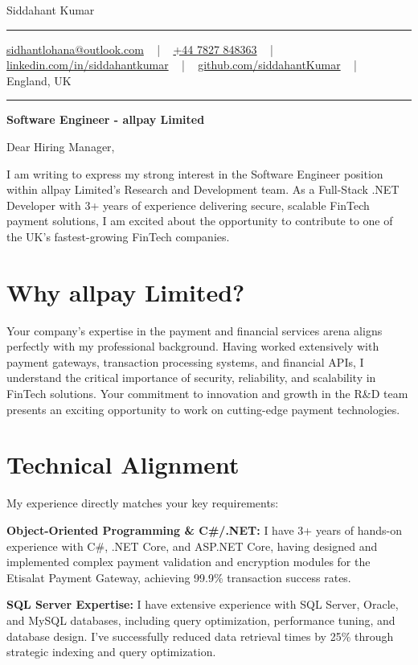 \documentclass[letterpaper,10pt]{article}
\newcommand{\documentTitle}[2]{
  \begin{center}
    \vspace*{-0.3in}
    {\Huge\color{accentTitle} #1}
    \vspace{8pt}
    {\color{accentLine} \hrule}
    \vspace{2pt}
    \footnotesize{#2}
    \vspace{2pt}
    {\color{accentLine} \hrule}
  \end{center}
}
\begin{document}
\documentTitle{Siddahant Kumar}{
\vspace{0.1cm}
\href{mailto:sidhantlohana@outlook.com}{sidhantlohana@outlook.com} ~ | ~
\href{tel:+447827848363}{+44 7827 848363} ~ | ~
\href{https://www.linkedin.com/in/siddahantkumar/}{linkedin.com/in/siddahantkumar} ~ | ~
\href{https://github.com/siddahantKumar}{github.com/siddahantKumar} ~ | ~
England, UK
}

\begin{center}
\textbf{Software Engineer - allpay Limited}
\end{center}

\vspace{0.2in}

Dear Hiring Manager,

I am writing to express my strong interest in the Software Engineer position within allpay Limited's Research and Development team. As a Full-Stack .NET Developer with 3+ years of experience delivering secure, scalable FinTech payment solutions, I am excited about the opportunity to contribute to one of the UK's fastest-growing FinTech companies.

\section{Why allpay Limited?}

Your company's expertise in the payment and financial services arena aligns perfectly with my professional background. Having worked extensively with payment gateways, transaction processing systems, and financial APIs, I understand the critical importance of security, reliability, and scalability in FinTech solutions. Your commitment to innovation and growth in the R\&D team presents an exciting opportunity to work on cutting-edge payment technologies.

\section{Technical Alignment}

My experience directly matches your key requirements:

\textbf{Object-Oriented Programming \& C\#/.NET:} I have 3+ years of hands-on experience with C\#, .NET Core, and ASP.NET Core, having designed and implemented complex payment validation and encryption modules for the Etisalat Payment Gateway, achieving 99.9\% transaction success rates.

\textbf{SQL Server Expertise:} I have extensive experience with SQL Server, Oracle, and MySQL databases, including query optimization, performance tuning, and database design. I've successfully reduced data retrieval times by 25\% through strategic indexing and query optimization.
\end{document}
